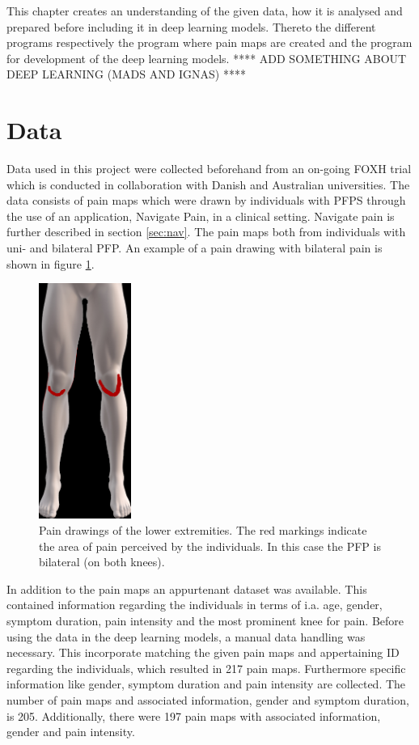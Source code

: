 This chapter creates an understanding of the given data, how it is analysed and prepared before including it in deep learning models. Thereto the different programs respectively the program where pain maps are created and the program for development of the deep learning models. **** ADD SOMETHING ABOUT DEEP LEARNING (MADS AND IGNAS) ****


\section{Data}
Data used in this project were collected beforehand from an on-going FOXH trial which is conducted in collaboration with Danish and Australian universities. The data consists of pain maps which were drawn by individuals with PFPS through the use of an application, Navigate Pain, in a clinical setting. Navigate pain is further described in section \ref{sec:nav}. The pain maps both from individuals with uni- and bilateral PFP. An example of a pain drawing with bilateral pain is shown in figure \ref{fig:kneepainmap}.

\begin{figure} [H]
\centering
\includegraphics[width=0.27\textwidth]{figures/kneepainmap}
\caption{Pain drawings of the lower extremities. The red markings indicate the area of pain perceived by the individuals. In this case the PFP is bilateral (on both knees).}
\label{fig:kneepainmap}
\end{figure}

\noindent
In addition to the pain maps an appurtenant dataset was available. This contained information regarding the individuals in terms of i.a. age, gender, symptom duration, pain intensity and the most prominent knee for pain.
Before using the data in the deep learning models, a manual data handling was necessary. This incorporate matching the given pain maps and appertaining ID regarding the individuals, which resulted in 217 pain maps. Furthermore specific information like gender, symptom duration and pain intensity are collected. The number of pain maps and associated information, gender and symptom duration, is 205. Additionally, there were 197 pain maps with associated information, gender and pain intensity.


